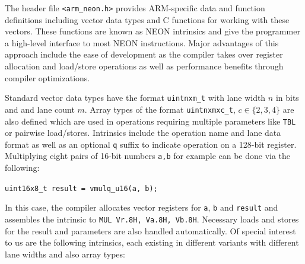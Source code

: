 The header file \texttt{<arm\_neon.h>} provides ARM-specific data and function
definitions including vector data types and C functions for working with these
vectors. These functions are known as NEON intrinsics \cite{neonintr:2022} and
give the programmer a high-level interface to most NEON instructions. Major
advantages of this approach include the ease of development as the compiler
takes over register allocation and load/store operations as well as performance
benefits through compiler optimizations.

Standard vector data types have the format \texttt{uintnxm\_t} with lane width
$n$ in bits and and lane count $m$. Array types of the format
\texttt{uintnxmxc\_t}, $c\in\{2,3,4\}$ are also defined which are used in
operations requiring multiple parameters like \texttt{TBL} or pairwise
load/stores. Intrinsics include the operation name and lane data format as well
as an optional \texttt{q} suffix to indicate operation on a 128-bit register.
Multiplying eight pairs of 16-bit numbers \texttt{a,b} for example can be done
via the following:

\begin{center}
    \texttt{uint16x8\_t result = vmulq\_u16(a, b);}
\end{center}

In this case, the compiler allocates vector registers for \texttt{a},
\texttt{b} and \texttt{result} and assembles the intrinsic to \texttt{MUL
Vr.8H, Va.8H, Vb.8H}. Necessary loads and stores for the result and parameters
are also handled automatically. Of special interest to us are the following
intrinsics, each existing in different variants with different lane widths and
also array types: \\

